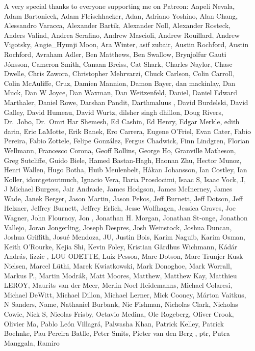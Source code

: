 \documentclass[
  letterpaper,
  DIV=11,
  numbers=noendperiod]{scrartcl}
\begin{document}
A very special thanks to everyone supporting me on Patreon: Aapeli
Nevala, Adam Bartonicek, Adam Fleischhacker, Adan, Adriano Yoshino, Alan
Chang, Alessandro Varacca, Alexander Bartik, Alexander Noll, Alexander
Rosteck, Anders Valind, Andrea Serafino, Andrew Mascioli, Andrew
Rouillard, Andrew Vigotsky, Angie\_Hyunji Moon, Ara Winter, asif zubair,
Austin Rochford, Austin Rochford, Avraham Adler, Ben Matthews, Ben
Swallow, Brynjolfur Gauti Jónsson, Cameron Smith, Canaan Breiss, Cat
Shark, Charles Naylor, Chase Dwelle, Chris Zawora, Christopher
Mehrvarzi, Chuck Carlson, Colin Carroll, Colin McAuliffe, Cruz, Damien
Mannion, Damon Bayer, dan mackinlay, Dan Muck, Dan W Joyce, Dan Waxman,
Dan Weitzenfeld, Daniel, Daniel Edward Marthaler, Daniel Rowe, Darshan
Pandit, Darthmaluus , David Burdelski, David Galley, David Humeau, David
Wurtz, dilsher singh dhillon, Doug Rivers, Dr.~Jobo, Dr.~Omri Har
Shemesh, Ed Cashin, Ed Henry, Edgar Merkle, edith darin, Eric LaMotte,
Erik Banek, Ero Carrera, Eugene O'Friel, Evan Cater, Fabio Pereira,
Fabio Zottele, Felipe González, Fergus Chadwick, Finn Lindgren, Florian
Wellmann, Francesco Corona, Geoff Rollins, George Ho, Granville
Matheson, Greg Sutcliffe, Guido Biele, Hamed Bastan-Hagh, Haonan Zhu,
Hector Munoz, Henri Wallen, Hugo Botha, Huib Meulenbelt, Håkan
Johansson, Ian Costley, Ian Koller, idontgetoutmuch, Ignacio Vera,
Ilaria Prosdocimi, Isaac S, Isaac Vock, J, J Michael Burgess, Jair
Andrade, James Hodgson, James McInerney, James Wade, Janek Berger, Jason
Martin, Jason Pekos, Jeff Burnett, Jeff Dotson, Jeff Helzner, Jeffrey
Burnett, Jeffrey Erlich, Jesse Wolfhagen, Jessica Graves, Joe Wagner,
John Flournoy, Jon , Jonathan H. Morgan, Jonathan St-onge, Jonathon
Vallejo, Joran Jongerling, Joseph Despres, Josh Weinstock, Joshua
Duncan, Joshua Griffith, Josué Mendoza, JU, Justin Bois, Karim Naguib,
Karim Osman, Keith O'Rourke, Kejia Shi, Kevin Foley, Kristian Gårdhus
Wichmann, Kádár András, lizzie , LOU ODETTE, Luiz Pessoa, Marc Dotson,
Marc Trunjer Kusk Nielsen, Marcel Lüthi, Marek Kwiatkowski, Mark
Donoghoe, Mark Worrall, Markus P., Martin Modrák, Matt Moores, Matthew,
Matthew Kay, Matthieu LEROY, Maurits van der Meer, Merlin Noel
Heidemanns, Michael Colaresi, Michael DeWitt, Michael Dillon, Michael
Lerner, Mick Cooney, Márton Vaitkus, N Sanders, Name, Nathaniel Burbank,
Nic Fishman, Nicholas Clark, Nicholas Cowie, Nick S, Nicolas Frisby,
Octavio Medina, Ole Rogeberg, Oliver Crook, Olivier Ma, Pablo León
Villagrá, Palwasha Khan, Patrick Kelley, Patrick Boehnke, Pau Pereira
Batlle, Peter Smits, Pieter van den Berg , ptr, Putra Manggala, Ramiro
\end{document}

